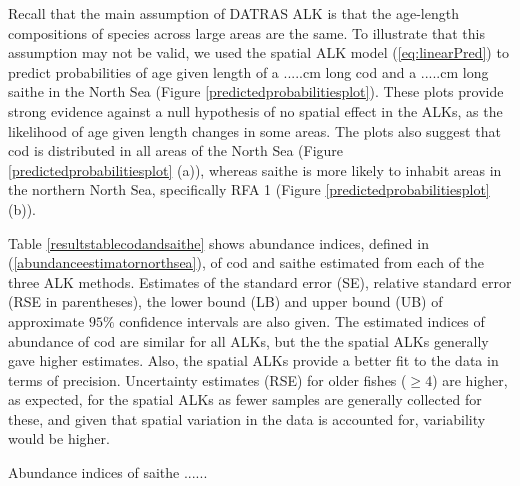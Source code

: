 \documentclass[a4paper 12pt]{article}
\numberwithin{equation}{section}
\begin{document}
Recall that the main assumption of DATRAS ALK is that the age-length compositions of species across large areas are the same. To illustrate that this assumption may not be valid, we used  the spatial ALK model (\ref{eq:linearPred}) to predict probabilities of age given length of a .....cm long cod and a .....cm long saithe in the North Sea (Figure \ref{predictedprobabilitiesplot}). These plots provide strong evidence against a null hypothesis of no spatial effect in the ALKs, as the likelihood of age given length changes in some areas. The plots also suggest that cod is distributed in all areas of the North Sea (Figure \ref{predictedprobabilitiesplot} (a)), whereas saithe is more likely to inhabit areas in the northern North Sea, specifically RFA 1 (Figure \ref{predictedprobabilitiesplot} (b)).

Table \ref{resultstablecodandsaithe} shows abundance indices, defined in (\ref{abundanceestimatornorthsea}), of cod and saithe estimated from each of the three ALK methods. Estimates of the standard error (SE), relative standard error (RSE in parentheses), the lower bound (LB) and upper bound (UB) of approximate $95 \%$ confidence intervals are also given. The estimated indices of abundance of cod are similar for all ALKs, but the the spatial ALKs generally gave higher estimates. Also, the spatial ALKs provide a better fit to the data in terms of precision. Uncertainty estimates (RSE) for older fishes ($\ge 4$) are higher, as expected, for the spatial ALKs as fewer samples are generally collected for these, and given that spatial variation in the data is accounted for, variability would be higher.

Abundance indices of saithe ......

\end{document}
